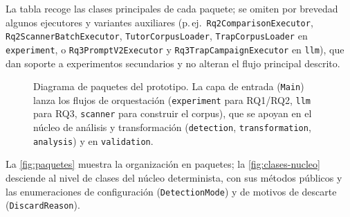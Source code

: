 \noindent La tabla recoge las clases principales de cada paquete; se omiten
por brevedad algunos ejecutores y variantes auxiliares (p.\,ej.\
\texttt{Rq2ComparisonExecutor}, \texttt{Rq2ScannerBatchExecutor},
\texttt{TutorCorpusLoader}, \texttt{TrapCorpusLoader} en
\texttt{experiment}, o \texttt{Rq3PromptV2Executor} y
\texttt{Rq3TrapCampaignExecutor} en \texttt{llm}), que dan soporte a
experimentos secundarios y no alteran el flujo principal descrito.

\begin{figure}[H]
\centering
{}
\caption{Diagrama de paquetes del prototipo. La capa de entrada
(\texttt{Main}) lanza los flujos de orquestación (\texttt{experiment} para
RQ1/RQ2, \texttt{llm} para RQ3, \texttt{scanner} para construir el corpus),
que se apoyan en el núcleo de análisis y transformación
(\texttt{detection}, \texttt{transformation}, \texttt{analysis}) y en
\texttt{validation}.}
\label{fig:paquetes}
\end{figure}

La \autoref{fig:paquetes} muestra la organización en paquetes; la
\autoref{fig:clases-nucleo} desciende al nivel de clases del núcleo
determinista, con sus métodos públicos y las enumeraciones de configuración
(\texttt{DetectionMode}) y de motivos de descarte (\texttt{DiscardReason}).

